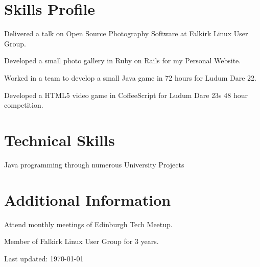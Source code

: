 \documentclass[11pt,a4paper]{article}
\renewenvironment{itemize}{
  \begin{list}{}{
    \setlength{\leftmargin}{1.5em}
    \setlength{\itemsep}{0.25em}
    \setlength{\parskip}{0pt}
    \setlength{\parsep}{0.25em}
    \renewcommand{\labelitemi}{$\bullet$}
  }
}{
  \end{list}
}
\begin{document}
\section*{Skills Profile}

\begin{itemize}
    \item Delivered a talk on Open Source Photography Software at Falkirk Linux User Group.
    \item Developed a small photo gallery in Ruby on Rails for my Personal Website.
    \item Worked in a team to develop a small Java game in 72 hours for Ludum Dare 22.
    \item Developed a HTML5 video game in CoffeeScript for Ludum Dare 23s 48 hour competition.

\end{itemize}

\section*{Technical Skills}

\begin{itemize}
    \item Java programming through numerous University Projects
\end{itemize}

\section*{Additional Information}

\begin{itemize}
    \item Attend monthly meetings of Edinburgh Tech Meetup.
    \item Member of Falkirk Linux User Group for 3 years.

\end{itemize}



\medskip
\begin{center}
  \begin{small}
    Last updated: \today
  \end{small}
\end{center}
\end{document}
